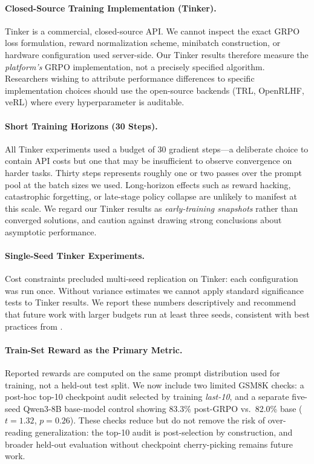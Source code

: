 \documentclass{article}
\begin{document}
\paragraph{Closed-Source Training Implementation (Tinker).}
Tinker is a commercial, closed-source API. We cannot inspect the exact GRPO
loss formulation, reward normalization scheme, minibatch construction, or
hardware configuration used server-side. Our Tinker results therefore measure
the \emph{platform's} GRPO implementation, not a precisely specified algorithm.
Researchers wishing to attribute performance differences to specific
implementation choices should use the open-source backends (TRL, OpenRLHF,
veRL) where every hyperparameter is auditable.

\paragraph{Short Training Horizons (30 Steps).}
All Tinker experiments used a budget of 30 gradient steps---a deliberate choice
to contain API costs but one that may be insufficient to observe convergence
on harder tasks. Thirty steps represents roughly one or two passes over the
prompt pool at the batch sizes we used. Long-horizon effects such as reward
hacking, catastrophic forgetting, or late-stage policy collapse are unlikely
to manifest at this scale. We regard our Tinker results as \emph{early-training
snapshots} rather than converged solutions, and caution against drawing strong
conclusions about asymptotic performance.

\paragraph{Single-Seed Tinker Experiments.}
Cost constraints precluded multi-seed replication on Tinker: each configuration
was run once. Without variance estimates we cannot apply standard significance
tests to Tinker results. We report these numbers descriptively and recommend
that future work with larger budgets run at least three seeds, consistent with
best practices from \citet{henderson2018deep}.

\paragraph{Train-Set Reward as the Primary Metric.}
Reported rewards are computed on the same prompt distribution used for
training, not a held-out test split. We now include two limited GSM8K checks:
a post-hoc top-10 checkpoint audit selected by training \emph{last-10}, and a
separate five-seed Qwen3-8B base-model control showing 83.3\% post-GRPO
vs.~82.0\% base ($t = 1.32$, $p = 0.26$). These checks reduce but do not
remove the risk of over-reading generalization: the top-10 audit is
post-selection by construction, and broader held-out evaluation without
checkpoint cherry-picking remains future work.
\end{document}
